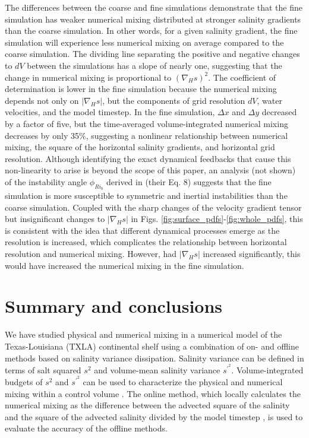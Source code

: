 \documentclass[draft]{agujournal2019}
\begin{document}
The differences between the coarse and fine simulations demonstrate that the fine simulation has weaker numerical mixing distributed at stronger salinity gradients than the coarse simulation. In other words, for a given salinity gradient, the fine simulation will experience less numerical mixing on average compared to the coarse simulation. The dividing line separating the positive and negative changes to $dV$ between the simulations has a slope of nearly one, suggesting that the change in numerical mixing is proportional to $(\nabla_H s)^2$. The coefficient of determination is lower in the fine simulation because the numerical mixing depends not only on $|\nabla_H s|$, but the components of grid resolution $dV$, water velocities, and the model timestep. In the fine simulation, $\Delta x$ and $\Delta y$ decreased by a factor of five, but the time-averaged volume-integrated numerical mixing decreases by only 35$\%$, suggesting a nonlinear relationship between numerical mixing, the square of the horizontal salinity gradients, and horizontal grid resolution. Although identifying the exact dynamical feedbacks that cause this non-linearity to arise is beyond the scope of this paper, an analysis (not shown) of the instability angle $\phi_{{Ri}_b}$ derived in  (their Eq. 8) suggests that the fine simulation is more susceptible to symmetric and inertial instabilities than the coarse simulation. Coupled with the sharp changes of the velocity gradient tensor but insignificant changes to $|\nabla_H s|$ in Figs. \ref{fig:surface_pdfs}-\ref{fig:whole_pdfs}, this is consistent with the idea that different dynamical processes emerge as the resolution is increased, which complicates the relationship between horizontal resolution and numerical mixing. However, had $|\nabla_H s|$ increased significantly, this would have increased the numerical mixing in the fine simulation.

\section{Summary and conclusions} \label{sec:conclusions}

We have studied physical and numerical mixing in a numerical model of the Texas-Louisiana (TXLA) continental shelf using a combination of on- and offline methods based on salinity variance dissipation. Salinity variance can be defined in terms of salt squared $s^2$ and volume-mean salinity variance $s^{\prime^2}$. Volume-integrated budgets of $s^2$ and $s^{\prime^2}$ can be used to characterize the physical and numerical mixing within a control volume \cite{Burchard_2019, Qu_2022_box}. The online method, which locally calculates the numerical mixing as the difference between the advected square of the salinity and the square of the advected salinity divided by the model timestep \cite{Burchard_2008}, is used to evaluate the accuracy of the offline methods.
\end{document}
